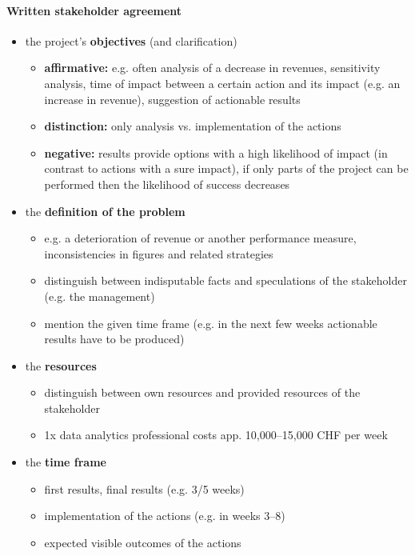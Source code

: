 \documentclass[a4paper, landscape, 6pt, fleqn]{scrartcl}
\renewcommand{\emph}[1]{\textbf{#1}}
\begin{document}
\begin{multicols*}{4}
\paragraph{Written stakeholder agreement}

\begin{itemize}
\item the project's \emph{objectives} (and clarification)
\begin{itemize}
\item \emph{affirmative:} e.g. often analysis of a decrease in revenues, sensitivity analysis, time of impact between a certain action and its impact (e.g. an increase in revenue), suggestion of actionable results
\item \emph{distinction:} only analysis vs. implementation of the actions
\item \emph{negative:} results provide options with a high likelihood of impact (in contrast to actions with a sure impact), if only parts of the project can be performed then the likelihood of success decreases
\end{itemize}
\item the \emph{definition of the problem}
\begin{itemize}
\item e.g. a deterioration of revenue or another performance measure, inconsistencies in figures and related strategies
\item distinguish between indisputable facts and speculations of the stakeholder (e.g. the management)
\item mention the given time frame (e.g. in the next few weeks actionable results have to be produced)
\end{itemize}
\item the \emph{resources}
\begin{itemize}
\item distinguish between own resources and provided resources of the stakeholder
\item 1x data analytics professional costs app. 10,000--15,000 CHF per week
\end{itemize}
\item the \emph{time frame}
\begin{itemize}
\item first results, final results (e.g. 3/5 weeks)
\item implementation of the actions (e.g. in weeks 3--8)
\item expected visible outcomes of the actions \\

\end{itemize}
\end{itemize}
\end{multicols*}
\end{document}
